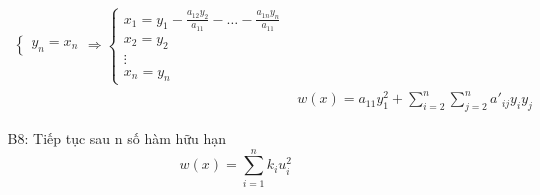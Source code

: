 \begin{enumerate}
\begin{enumerate}
\begin{align*}
\begin{cases}
                y_n = x_n
            \end{cases}
            \Rightarrow
            \begin{cases}
                x_1 = y_1 - \frac{a_{12}y_2}{a_{11}} - \ldots - \frac{a_{1n}y_n}{a_{11}}\\
                x_2 = y_2\\
                \vdots\\
                x_n = y_n
            \end{cases}\\
            &w(x) = a_{11}y_1^2 + \sum_{i=2}^n \sum_{j=2}^n a'_{ij}y_iy_j
        \end{align*}
        \item[B8:] Tiếp tục sau n số hàm hữu hạn  \begin{equation*}
            w(x) = \sum_{i=1}^n k_iu_i^2
        \end{equation*}
    \end{enumerate}        


\end{enumerate}
